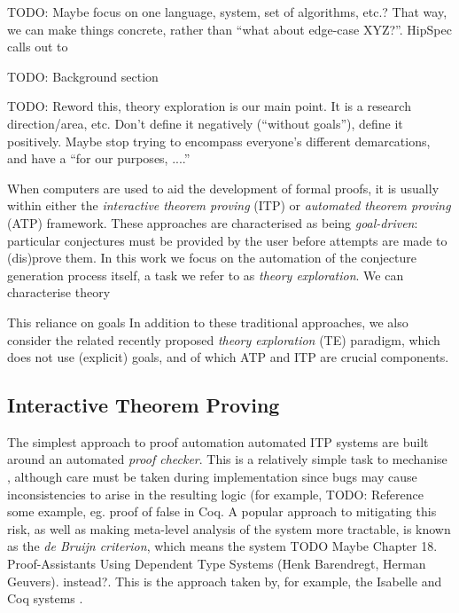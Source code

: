 \documentclass[]{article}
\begin{document}
TODO: Maybe focus on one language, system, set of algorithms, etc.? That way, we can make things concrete, rather than ``what about edge-case XYZ?''. HipSpec calls out to

TODO: Background section

TODO: Reword this, theory exploration is our main point. It is a research direction/area, etc. Don't define it negatively (``without goals''), define it positively. Maybe stop trying to encompass everyone's different demarcations, and have a ``for our purposes, ....''

When computers are used to aid the development of formal proofs, it is usually within either the \emph{interactive theorem proving} (ITP) or \emph{automated theorem proving} (ATP) framework. These approaches are characterised as being \emph{goal-driven}: particular conjectures must be provided by the user before attempts are made to (dis)prove them. In this work we focus on the automation of the conjecture generation process itself, a task we refer to as \emph{theory exploration}. We can characterise theory

This reliance on goals In addition to these traditional approaches, we also consider the related recently proposed \emph{theory exploration} (TE) paradigm, which does not use (explicit) goals, and of which ATP and ITP are crucial components.

\subsection{Interactive Theorem Proving}

The simplest approach to proof automation automated ITP systems are built around an automated \emph{proof checker}. This is a relatively simple task to mechanise \cite{boyer1994qed}, although care must be taken during implementation since bugs may cause inconsistencies to arise in the resulting logic (for example, TODO: Reference some example, eg. proof of false in Coq. A popular approach to mitigating this risk, as well as making meta-level analysis of the system more tractable, is known as the \emph{de Bruijn criterion}, which means the system  \cite[\S~2]{barendregt2001proof}  TODO Maybe Chapter 18. Proof-Assistants Using Dependent Type Systems (Henk Barendregt, Herman Geuvers). instead?. This is the approach taken by, for example, the Isabelle and Coq systems \cite{nipkow2002isabelle} \cite{bertot2013interactive}.
\end{document}

